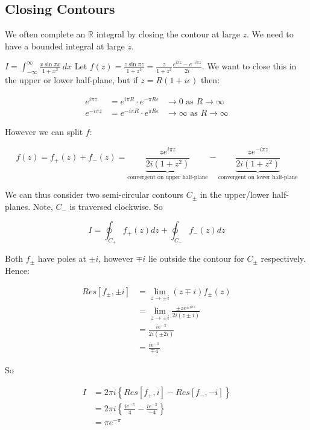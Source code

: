 \documentclass{physics_notes}
\begin{document}
\subsection{Closing Contours}

We often complete an $\mathbb{R}$ integral by closing the contour at large $z$. We need to have a bounded integral at large $z$.

\begin{example}{$I = \int_{-\infty}^{\infty} \frac{x\sin{\pi x}}{1 + x^2}\, dx $}
	Let $f(z) = \frac{z\sin{\pi z}}{1+z^2} = \frac{z}{1+z^2} \frac{e^{i\pi z} - e^{-i\pi z}}{2i}$. We want to close this in the upper or lower half-plane, but if $z = R(1 + i\epsilon)$ then:

	\begin{align*}
		e^{i\pi z} &= e^{i\pi R} \cdot e^{-\pi R \epsilon} &\to 0 \text{ as } R\to\infty \\
		e^{-i\pi z} &= e^{-i\pi R} \cdot e^{\pi R \epsilon} &\to \infty \text{ as } R\to\infty
	\end{align*}

	However we can split $f$:

	\[
		f(z) = f_+ (z) + f_- (z) = \underbrace{\frac{ze^{i\pi z}}{2i(1+z^2)}}_\text{convergent on upper half-plane} - \underbrace{\frac{ze^{-i\pi z}}{2i(1+z^2)}}_\text{convergent on lower half-plane}
	\]

	We can thus consider two semi-circular contours $C_\pm$ in the upper/lower half-planes. Note, $C_-$ is traversed clockwise. So

	\[ I = \oint_{C_+} f_+ (z) dz + \oint_{C_-} f_- (z) dz \]

	Both $f_\pm$ have poles at $\pm i$, however $\mp i$ lie outside the contour for $C_\pm$ respectively. Hence:

	\begin{align*}
		Res[f_\pm, \pm i] &= \lim_{z\to\pm i} (z\mp i) f_\pm (z) \\
		&= \lim_{z\to\pm i} \frac{\pm ze^{\pm i \pi z}}{2i(z\pm i)} \\
		&= \frac{ie^{-\pi}}{2i(\pm2i)} \\
		&= \frac{ie^{-\pi}}{\mp 4}
	\end{align*}

	So 

	\begin{align*}
		I &= 2\pi i \left\{ Res[f_+, i] - Res[f_-, -i] \right\} \\
		&= 2\pi i \left\{\frac{ie^{-\pi}}{4} - \frac{ie^{-\pi}}{-4}\right\} \\
		&= \pi e^{-\pi}
	\end{align*}
\end{example}
\end{document}
